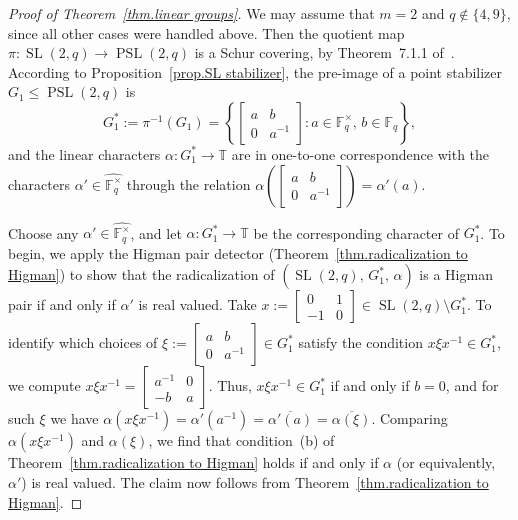 \begin{proof}[Proof of Theorem~\ref{thm.linear groups}]
We may assume that $m=2$ and $q \notin \{ 4,9 \}$, since all other cases were handled above.
Then the quotient map $\pi \colon \operatorname{SL}(2,q) \to \operatorname{PSL}(2,q)$ is a Schur covering, by Theorem~7.1.1 of~\cite{Karpilovsky:87}.
According to Proposition~\ref{prop.SL stabilizer}, the pre-image of a point stabilizer $G_1 \leq \operatorname{PSL}(2,q)$ is
\[ G_1^* := \pi^{-1}(G_1) = \left\{ \begin{bmatrix} a & b \\ 0 & a^{-1} \end{bmatrix} : a \in \mathbb{F}_q^\times,\, b \in \mathbb{F}_q \right\}, \]
and the linear characters $\alpha \colon G_1^* \to \mathbb{T}$ are in one-to-one correspondence with the characters $\alpha' \in \widehat{ \mathbb{F}_q^\times }$ through the relation $\alpha\left( \begin{bmatrix} a & b \\ 0 & a^{-1} \end{bmatrix} \right) = \alpha'(a)$.

Choose any $\alpha' \in \widehat{ \mathbb{F}_q^\times }$, and let $\alpha \colon G_1^* \to \mathbb{T}$ be the corresponding character of $G_1^*$.
To begin, we apply the Higman pair detector (Theorem~\ref{thm.radicalization to Higman}) to show that the radicalization of $( \operatorname{SL}(2,q),\, G_1^*,\, \alpha)$ is a Higman pair if and only if $\alpha'$ is real valued.
Take $x := \begin{bmatrix} 0 & 1 \\ -1 & 0 \end{bmatrix} \in \operatorname{SL}(2,q) \setminus G_1^*$.
To identify which choices of $\xi := \begin{bmatrix} a & b \\ 0 & a^{-1} \end{bmatrix} \in G_1^*$ satisfy the condition $x \xi x^{-1} \in G_1^*$, we compute $x \xi x^{-1} = \begin{bmatrix} a^{-1} & 0 \\ -b & a \end{bmatrix}$.
Thus, $x\xi x^{-1} \in G_1^*$ if and only if $b = 0$, and for such $\xi$ we have $\alpha(x\xi x^{-1}) = \alpha'(a^{-1}) = \overline{ \alpha'(a) } = \overline{\alpha(\xi)}$.
Comparing $\alpha(x \xi x^{-1})$ and $\alpha(\xi)$, we find that condition~(b) of Theorem~\ref{thm.radicalization to Higman} holds if and only if $\alpha$ (or equivalently, $\alpha'$) is real valued.
The claim now follows from Theorem~\ref{thm.radicalization to Higman}.


\end{proof}
